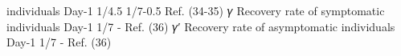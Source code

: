 individuals  Day-1 1/4.5  1/7-0.5 Ref. (34-35)
𝛾 Recovery rate of symptomatic
individuals  Day-1 1/7 - Ref. (36)
𝛾′ Recovery rate of asymptomatic
individuals  Day-1 1/7 - Ref. (36)